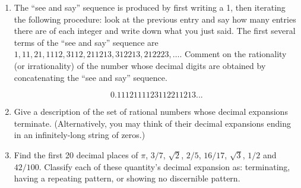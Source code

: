 \begin{enumerate}
\vfill


\vfill

\textbookpagebreak

\item The ``see and say'' sequence is produced by first writing a 1, 
then iterating the following procedure:  look at the previous entry 
and say how many entries there are of each integer and write down what 
you just said.  The first several terms of the ``see and say'' sequence 
are $1, 11, 21, 1112, 3112, 211213, 312213, 212223, \ldots$.  Comment on the
rationality (or irrationality) of the number whose decimal digits are obtained 
by concatenating the ``see and say'' sequence.

\[ 0.1112111123112211213... \]

\vfill

\vfill

\workbookpagebreak

\item Give a description of the set of rational numbers whose decimal
expansions terminate.  (Alternatively, you may think of their decimal
expansions ending in an infinitely-long string of zeros.)


\vfill

\item Find the first 20 decimal places of $\pi$, $3/7$, $\sqrt{2}$, 
  $2/5$, $16/17$, $\sqrt{3}$, $1/2$ and $42/100$.  Classify each of
these quantity's decimal expansion as: terminating, having a repeating
pattern, or showing no discernible pattern.

\end{enumerate}
